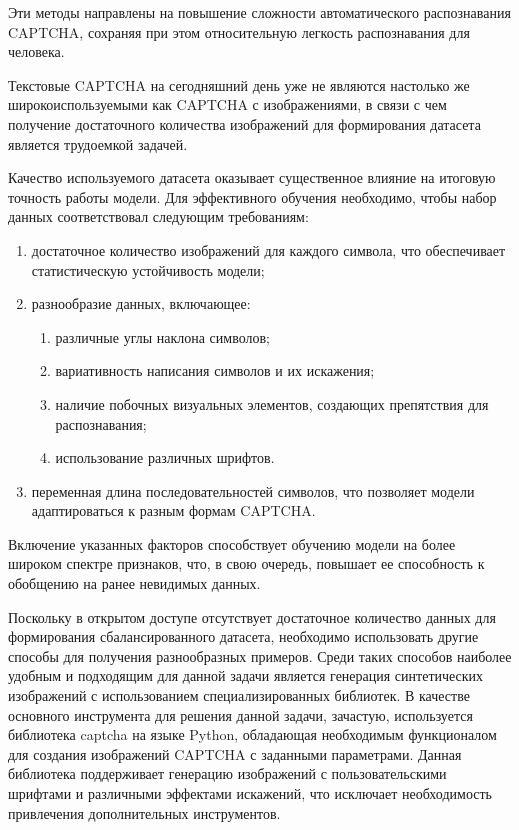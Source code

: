 Эти методы направлены на повышение сложности автоматического распознавания 
CAPTCHA, сохраняя при этом относительную легкость распознавания для человека.

Текстовые CAPTCHA на сегодняшний день уже не являются настолько же 
широкоиспользуемыми как CAPTCHA с изображениями, в связи с чем получение 
достаточного количества изображений для формирования датасета является трудоемкой 
задачей.

Качество используемого датасета оказывает существенное влияние на итоговую 
точность работы модели. Для эффективного обучения необходимо, чтобы набор данных 
соответствовал следующим требованиям:

\begin{enumerate}
    \item достаточное количество изображений для каждого символа, что 
    обеспечивает статистическую устойчивость модели;
    \item разнообразие данных, включающее:
    \begin{enumerate}
        \item различные углы наклона символов;
        \item вариативность написания символов и их искажения;
        \item наличие побочных визуальных элементов, создающих препятствия для 
        распознавания;
        \item использование различных шрифтов.
    \end{enumerate}
    \item переменная длина последовательностей символов, что позволяет модели 
    адаптироваться к разным формам CAPTCHA.
\end{enumerate}

Включение указанных факторов способствует обучению модели на более широком 
спектре признаков, что, в свою очередь, повышает ее способность к обобщению на 
ранее невидимых данных.

Поскольку в открытом доступе отсутствует достаточное количество данных для 
формирования сбалансированного датасета, необходимо использовать другие способы 
для получения разнообразных примеров. Среди таких способов наиболее удобным и 
подходящим для данной задачи является генерация синтетических изображений с 
использованием специализированных библиотек. В качестве основного инструмента 
для решения данной задачи, зачастую, используется библиотека captcha на языке 
Python, обладающая необходимым функционалом для создания изображений CAPTCHA с 
заданными параметрами. Данная библиотека поддерживает генерацию изображений с 
пользовательскими шрифтами и различными эффектами искажений, что исключает 
необходимость привлечения дополнительных инструментов.

